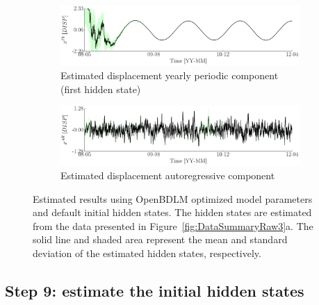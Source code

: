 \begin{figure}[h!]
\ContinuedFloat
\begin{subfigure}{\linewidth}
\includegraphics[width=0.9\linewidth]{./docfigs/Example_DISPSIM_ANOMALY/optim_param_default_initialhiddenstate/DISP_S1_4.pdf}
\caption{Estimated displacement yearly periodic component (first hidden state)}
\end{subfigure}
\begin{subfigure}{\linewidth}
\includegraphics[width=0.9\linewidth]{./docfigs/Example_DISPSIM_ANOMALY/optim_param_default_initialhiddenstate/DISP_AR_6.pdf} 
\caption{Estimated displacement autoregressive component}
\end{subfigure}
\caption{Estimated results using OpenBDLM optimized model parameters and default initial hidden states. The hidden states are estimated from the data presented in Figure~\ref{fig:DataSummaryRaw3}a. The solid line and shaded area represent the mean and standard deviation of the estimated hidden states, respectively.}
\label{fig:DISPSIMANOMALYOptimizedDefaultExample3}
\end{figure}


\subsection{Step 9: estimate the initial hidden states}


